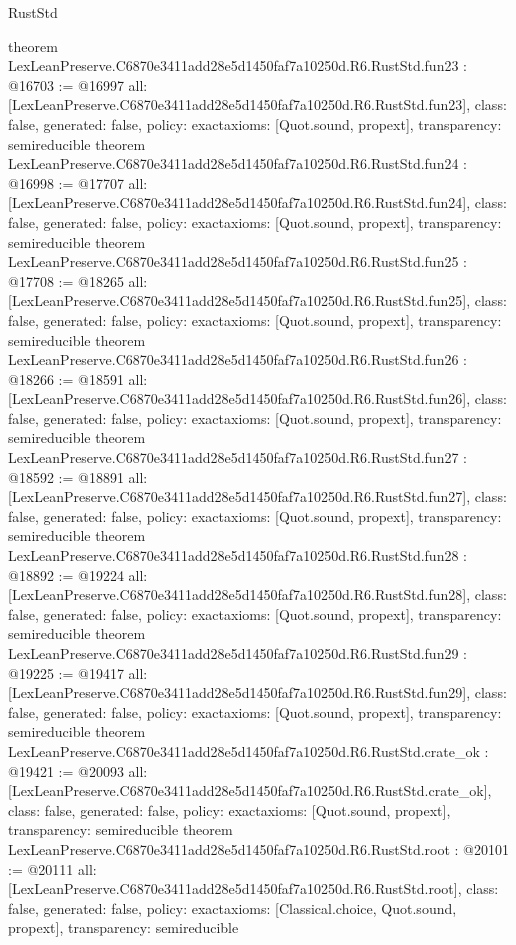 \begin{lexlean}{RustStd}
\begin{coremodule}
{}
theorem LexLeanPreserve.C6870e3411add28e5d1450faf7a10250d.R6.RustStd.fun23 : @16703 := @16997 {
  all: [LexLeanPreserve.C6870e3411add28e5d1450faf7a10250d.R6.RustStd.fun23],
  class: false,
  generated: false,
  policy: exact{axioms: [Quot.sound, propext]},
  transparency: semireducible
}
theorem LexLeanPreserve.C6870e3411add28e5d1450faf7a10250d.R6.RustStd.fun24 : @16998 := @17707 {
  all: [LexLeanPreserve.C6870e3411add28e5d1450faf7a10250d.R6.RustStd.fun24],
  class: false,
  generated: false,
  policy: exact{axioms: [Quot.sound, propext]},
  transparency: semireducible
}
theorem LexLeanPreserve.C6870e3411add28e5d1450faf7a10250d.R6.RustStd.fun25 : @17708 := @18265 {
  all: [LexLeanPreserve.C6870e3411add28e5d1450faf7a10250d.R6.RustStd.fun25],
  class: false,
  generated: false,
  policy: exact{axioms: [Quot.sound, propext]},
  transparency: semireducible
}
theorem LexLeanPreserve.C6870e3411add28e5d1450faf7a10250d.R6.RustStd.fun26 : @18266 := @18591 {
  all: [LexLeanPreserve.C6870e3411add28e5d1450faf7a10250d.R6.RustStd.fun26],
  class: false,
  generated: false,
  policy: exact{axioms: [Quot.sound, propext]},
  transparency: semireducible
}
theorem LexLeanPreserve.C6870e3411add28e5d1450faf7a10250d.R6.RustStd.fun27 : @18592 := @18891 {
  all: [LexLeanPreserve.C6870e3411add28e5d1450faf7a10250d.R6.RustStd.fun27],
  class: false,
  generated: false,
  policy: exact{axioms: [Quot.sound, propext]},
  transparency: semireducible
}
theorem LexLeanPreserve.C6870e3411add28e5d1450faf7a10250d.R6.RustStd.fun28 : @18892 := @19224 {
  all: [LexLeanPreserve.C6870e3411add28e5d1450faf7a10250d.R6.RustStd.fun28],
  class: false,
  generated: false,
  policy: exact{axioms: [Quot.sound, propext]},
  transparency: semireducible
}
theorem LexLeanPreserve.C6870e3411add28e5d1450faf7a10250d.R6.RustStd.fun29 : @19225 := @19417 {
  all: [LexLeanPreserve.C6870e3411add28e5d1450faf7a10250d.R6.RustStd.fun29],
  class: false,
  generated: false,
  policy: exact{axioms: [Quot.sound, propext]},
  transparency: semireducible
}
theorem LexLeanPreserve.C6870e3411add28e5d1450faf7a10250d.R6.RustStd.crate_ok : @19421 := @20093 {
  all: [LexLeanPreserve.C6870e3411add28e5d1450faf7a10250d.R6.RustStd.crate_ok],
  class: false,
  generated: false,
  policy: exact{axioms: [Quot.sound, propext]},
  transparency: semireducible
}
theorem LexLeanPreserve.C6870e3411add28e5d1450faf7a10250d.R6.RustStd.root : @20101 := @20111 {
  all: [LexLeanPreserve.C6870e3411add28e5d1450faf7a10250d.R6.RustStd.root],
  class: false,
  generated: false,
  policy: exact{axioms: [Classical.choice, Quot.sound, propext]},
  transparency: semireducible
}


\end{coremodule}
\end{lexlean}
